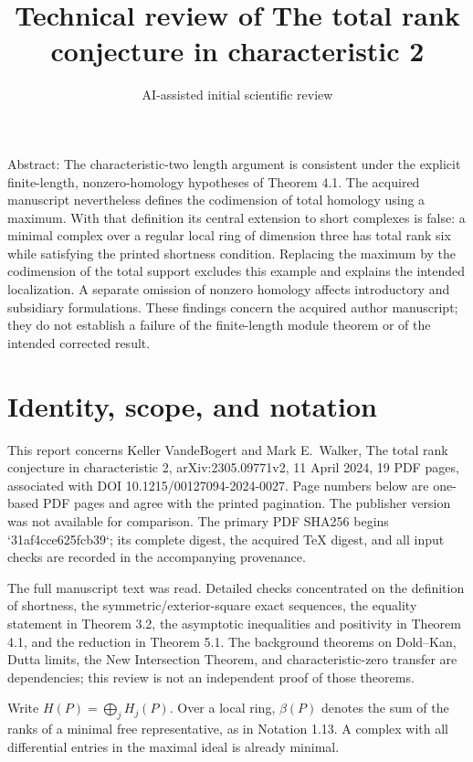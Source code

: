 \documentclass[10pt]{article}
\title{Technical review of
The total rank conjecture in characteristic 2}
\author{AI-assisted initial scientific review}
\date{}
\begin{document}
\maketitle
Abstract: The characteristic-two length argument is consistent under the explicit finite-length, nonzero-homology hypotheses of Theorem 4.1. The acquired manuscript nevertheless defines the codimension of total homology using a maximum. With that definition its central extension to short complexes is false: a minimal complex over a regular local ring of dimension three has total rank six while satisfying the printed shortness condition. Replacing the maximum by the codimension of the total support excludes this example and explains the intended localization. A separate omission of nonzero homology affects introductory and subsidiary formulations. These findings concern the acquired author manuscript; they do not establish a failure of the finite-length module theorem or of the intended corrected result.\par
\section*{Identity, scope, and notation}
This report concerns Keller VandeBogert and Mark E. Walker, The total rank conjecture in characteristic 2, arXiv:2305.09771v2, 11 April 2024, 19 PDF pages, associated with DOI 10.1215/00127094-2024-0027. Page numbers below are one-based PDF pages and agree with the printed pagination. The publisher version was not available for comparison. The primary PDF SHA256 begins `31af4cce625fcb39`; its complete digest, the acquired TeX digest, and all input checks are recorded in the accompanying provenance.\par
The full manuscript text was read. Detailed checks concentrated on the definition of shortness, the symmetric/exterior-square exact sequences, the equality statement in Theorem 3.2, the asymptotic inequalities and positivity in Theorem 4.1, and the reduction in Theorem 5.1. The background theorems on Dold–Kan, Dutta limits, the New Intersection Theorem, and characteristic-zero transfer are dependencies; this review is not an independent proof of those theorems.\par
Write \(H(P)=\bigoplus_jH_j(P)\). Over a local ring, \(\beta(P)\) denotes the sum of the ranks of a minimal free representative, as in Notation 1.13. A complex with all differential entries in the maximal ideal is already minimal.\par
\end{document}
